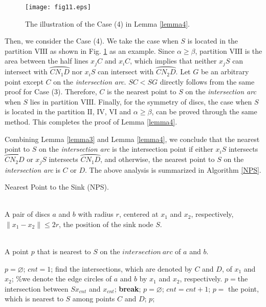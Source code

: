 \documentclass[journal]{IEEEtran}
\begin{document}
\begin{IEEEproof}
\begin{figure}
\begin{center}
\texttt{[image: fig11.eps]}    \caption{The illustration of the Case (4) in Lemma \ref{lemma4}.}
\label{fig11}                                 \end{center}                                 \end{figure}

Then, we consider the Case (4). We take the case when $S$ is located in the partition
$\mathrm{VIII}$ as shown in Fig. \ref{fig11} as an example. Since $\alpha \geq\beta$, partition $\mathrm{VIII}$ is the area between the half lines $x_jC$ and $x_iC$, which implies that neither $x_jS$
can intersect with $\wideparen{CN_1D}$ nor $x_iS$ can intersect with $\wideparen{CN_2D}$. Let $G$ be an arbitrary point except $C$ on the
\emph{intersection arc}. $SC<SG$ directly follows from the same proof for Case (3). Therefore, $C$ is the nearest point to $S$ on the
\emph{intersection arc} when $S$ lies in partition $\mathrm{VIII}$. Finally, for the symmetry of discs, the case when $S$ is located
in the partition $\mathrm{II}$, $\mathrm{IV}$, $\mathrm{VI}$ and $\alpha \geq \beta$, can be proved through the same method. This completes the proof of Lemma \ref{lemma4}.
\end{IEEEproof}

Combining Lemma \ref{lemma3} and Lemma \ref{lemma4}, we conclude that the nearest point to $S$ on the \emph{intersection arc} is the intersection point if either $x_iS$ intersects $\wideparen{CN_2D}$ or $x_jS$ intersects $\wideparen{CN_1D}$, and otherwise, the nearest point to $S$ on the \emph{intersection arc} is $C$ or $D$. The above analysis is summarized in Algorithm \ref{NPS}.

\begin{algorithm}[htb]         \caption{Nearest Point to the Sink (NPS).}             
\label{NPS}                  
\begin{algorithmic}[1]                
\REQUIRE ~~\\                          
   A pair of discs $a$ and $b$ with radius $r$, centered at $x_1$ and $x_2$, respectively, $\|x_1-x_2\|\leq 2r$, the position of the sink node $S$.

\ENSURE ~~\\                           
    A point $p$ that is nearest to $S$ on the $intersection\ arc$ of $a$ and $b$.

\STATE $p=\varnothing$;
\STATE $cnt=1$;
\STATE find the intersections, which are denoted by $C$ and $D$, of $x_1$ and $x_2$; \%we denote the edge circles of $a$ and $b$ by $x_1$ and $x_2$,
respectively.
    \STATE $p=$the intersection between $Sx_{cnt}$ and $x_{cnt}$;
        \STATE \textbf{break};
    \ENDIF
    \STATE $p=\varnothing$;
    \STATE $cnt=cnt+1$;
\ENDWHILE
{}
    \STATE $p=$ the point, which is nearest to $S$ among points $C$ and $D$;
\ENDIF
\RETURN $p$;                \end{algorithmic}

\end{algorithm}
\end{document}
